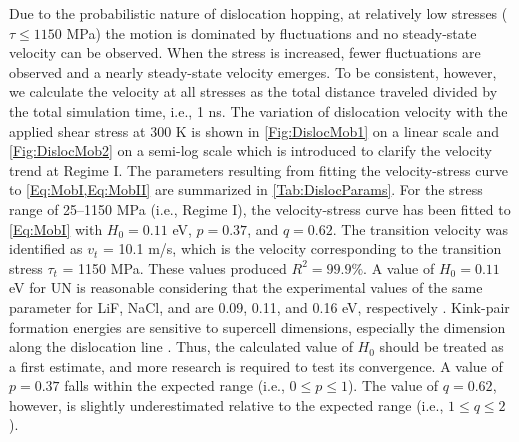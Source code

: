 \documentclass[applsci,article,submit,pdftex,moreauthors]{Definitions/mdpi}
\newcommand{\?}{\stackrel{?}{=}}
\providecommand{\DIFadd}[1]{{\bf #1}} %
\providecommand{\DIFdel}[1]{} %
\providecommand{\DIFaddbegin}{\protect\color{blue}} %
\providecommand{\DIFaddend}{\protect\color{black}} %
\providecommand{\DIFdelbegin}{\protect\color{red}} %
\providecommand{\DIFdelend}{\protect\color{black}} %
\newcommand{\DIFscaledelfig}{0.5}
\newlength{\DIFdelgraphicswidth} %
\newlength{\DIFdelgraphicsheight} %
\newcommand{\DIFaddincludegraphics}[2][]{{\color{blue}\fbox{\DIFOincludegraphics[#1]{#2}}}} %
\newcommand{\DIFdelincludegraphics}[2][]{%
\sbox{\DIFdelgraphicsbox}{\DIFOincludegraphics[#1]{#2}}%
\settoboxwidth{\DIFdelgraphicswidth}{\DIFdelgraphicsbox} %
\settoboxtotalheight{\DIFdelgraphicsheight}{\DIFdelgraphicsbox} %
\scalebox{\DIFscaledelfig}{%
\parbox[b]{\DIFdelgraphicswidth}{\usebox{\DIFdelgraphicsbox}\\[-\baselineskip] \rule{\DIFdelgraphicswidth}{0em}}\llap{\resizebox{\DIFdelgraphicswidth}{\DIFdelgraphicsheight}{%
\setlength{\unitlength}{\DIFdelgraphicswidth}%
\begin{picture}(1,1)%
\thicklines\linethickness{2pt} %
{\color[rgb]{1,0,0}\put(0,0){\framebox(1,1){}}}%
{\color[rgb]{1,0,0}\put(0,0){\line( 1,1){1}}}%
{\color[rgb]{1,0,0}\put(0,1){\line(1,-1){1}}}%
\end{picture}%
}\hspace*{3pt}}} %
} %
\DeclareRobustCommand{\DIFaddbegin}{\DIFOaddbegin \let\includegraphics\DIFaddincludegraphics} %
\DeclareRobustCommand{\DIFaddend}{\DIFOaddend \let\includegraphics\DIFOincludegraphics} %
\DeclareRobustCommand{\DIFdelbegin}{\DIFOdelbegin \let\includegraphics\DIFdelincludegraphics} %
\DeclareRobustCommand{\DIFdelend}{\DIFOaddend \let\includegraphics\DIFOincludegraphics} %
\begin{document}
Due to the probabilistic nature of dislocation hopping, at relatively low stresses ($\tau \leq 1150$ MPa) the motion is dominated by fluctuations and no steady-state velocity can be observed. When the stress is increased, fewer fluctuations are observed and a nearly steady-state velocity emerges. To be consistent, however, we calculate the velocity at all stresses as the total distance traveled divided by the total simulation time, i.e., 1 ns. The variation of dislocation velocity with the applied shear stress at 300 K is shown in \cref{Fig:DislocMob1} on a linear scale and \cref{Fig:DislocMob2} on a semi-log scale which is introduced to clarify the velocity trend at Regime I. The parameters resulting from fitting the velocity-stress curve to \cref{Eq:MobI,Eq:MobII} are summarized in \cref{Tab:DislocParams}. For the stress range of 25--1150 MPa (i.e., Regime I), the velocity-stress curve has been fitted to \cref{Eq:MobI} with $H_0 = 0.11$ eV, $p=0.37$, and $q=0.62$. The transition velocity was identified as $v_t$ = 10.1 m/s, which is the velocity corresponding to the transition stress $\tau_t$ = 1150 MPa. These values produced \DIFaddbegin \DIFadd{a coefficient of determination }\DIFaddend $R^2 = 99.9\%$. A value of $H_0 = 0.11$ eV for UN is reasonable considering that the experimental values of the same parameter for LiF, NaCl, and \DIFdelbegin \DIFdel{KCl }\DIFdelend \DIFaddbegin \DIFadd{potassium chloride (KCl) }\DIFaddend are 0.09, 0.11, and 0.16 eV, respectively \cite{Haasen1985}. Kink-pair formation energies are sensitive to supercell dimensions, especially the dimension along the dislocation line \cite{Ventelon2009}. Thus, the calculated value of $H_0$ should be treated as a first estimate, and more research is required to test its convergence. A value of $p = 0.37$ falls within the expected range (i.e., $0 \leq p \leq 1$). The value of $q = 0.62$, however, is slightly underestimated relative to the expected range (i.e., $1 \leq q \leq 2$).
\end{document}
